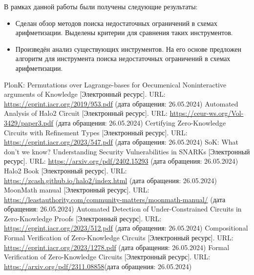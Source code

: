 \documentclass[a4paper]{article}
\begin{document}
В рамках данной работы были получены следующие результаты:
\begin{itemize}
    \item Сделан обзор методов поиска недостаточных ограничений в схемах арифметизации. Выделены критерии для сравнения таких инструментов.
    \item Произведён анализ существующих инструментов. На его основе предложен алгоритм для инструмента поиска недостаточных ограничений в схемах арифметизации.
\end{itemize}

\newpage

\begin{thebibliography}{}
      PlonK: Permutations over Lagrange-bases for Oecumenical Noninteractive arguments of Knowledge [Электронный ресурс]. URL: \href{https://eprint.iacr.org/2019/953.pdf}{https://eprint.iacr.org/2019/953.pdf} (дата обращения: 26.05.2024)
      Automated Analysis of Halo2 Circuit [Электронный ресурс]. URL: \href{https://ceur-ws.org/Vol-3429/paper3.pdf}{https://ceur-ws.org/Vol-3429/paper3.pdf} (дата обращения: 26.05.2024)
      Certifying Zero-Knowledge Circuits with Refinement Types [Электронный ресурс]. URL: \href{https://eprint.iacr.org/2023/547.pdf}{https://eprint.iacr.org/2023/547.pdf} (дата обращения: 26.05.2024)
      SoK: What don’t we know? Understanding Security Vulnerabilities in SNARKs [Электронный ресурс]. URL: \href{https://arxiv.org/pdf/2402.15293}{https://arxiv.org/pdf/2402.15293} (дата обращения: 26.05.2024)
      Halo2 Book [Электронный ресурс]. 
    URL: \href{https://zcash.github.io/halo2/index.html}{https://zcash.github.io/halo2/index.html}
    (дата обращения: 26.05.2024)
      MoonMath manual [Электронный ресурс]. URL: \href{https://leastauthority.com/community-matters/moonmath-manual/}{https://leastauthority.com/community-matters/moonmath-manual/} (дата обращения: 26.05.2024)
      Automated Detection of Under-Constrained Circuits in Zero-Knowledge Proofs [Электронный ресурс]. URL: \href{https://eprint.iacr.org/2023/512.pdf}{https://eprint.iacr.org/2023/512.pdf} (дата обращения: 26.05.2024)
      Compositional Formal Verification
    of Zero-Knowledge Circuits [Электронный ресурс]. URL: \href{https://eprint.iacr.org/2023/1278.pdf}{https://eprint.iacr.org/2023/1278.pdf} (дата обращения: 26.05.2024)
      Formal Verification of Zero-Knowledge Circuits [Электронный ресурс]. URL: \href{https://arxiv.org/pdf/2311.08858}{https://arxiv.org/pdf/2311.08858}(дата обращения: 26.05.2024)

\end{thebibliography}
\end{document}
